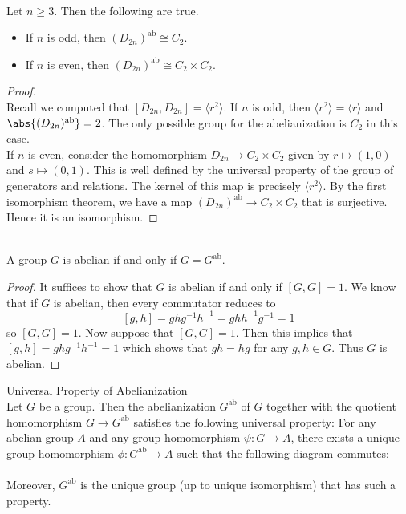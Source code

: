 \documentclass[a4paper]{article}
\begin{document}
\begin{eg}{}{}\\
Let $n\geq 3$. Then the following are true. 
\begin{itemize}
\item If $n$ is odd, then $(D_{2n})^\text{ab}\cong C_2$. 
\item If $n$ is even, then $(D_{2n})^\text{ab}\cong C_2\times C_2$. 
\end{itemize}
\begin{proof}\\
Recall we computed that $[D_{2n},D_{2n}]=\langle r^2\rangle$. If $n$ is odd, then $\langle r^2\rangle=\langle r\rangle$ and $\abs{(D_{2n})^\text{ab}}=2$. The only possible group for the abelianization is $C_2$ in this case. \\

If $n$ is even, consider the homomorphism $D_{2n}\to C_2\times C_2$ given by $r\mapsto(1,0)$ and $s\mapsto(0,1)$. This is well defined by the universal property of the group of generators and relations. The kernel of this map is precisely $\langle r^2\rangle$. By the first isomorphism theorem, we have a map $(D_{2n})^\text{ab}\to C_2\times C_2$ that is surjective. Hence it is an isomorphism. 
\end{proof}
\end{eg}

\begin{prp}{}{}\\
A group $G$ is abelian if and only if $G=G^\text{ab}$. 
\begin{proof}
It suffices to show that $G$ is abelian if and only if $[G,G]=1$. We know that if $G$ is abelian, then every commutator reduces to $$[g,h]=ghg^{-1}h^{-1}=ghh^{-1}g^{-1}=1$$ so $[G,G]=1$. Now suppose that $[G,G]=1$. Then this implies that $[g,h]=ghg^{-1}h^{-1}=1$ which shows that $gh=hg$ for any $g,h\in G$. Thus $G$ is abelian. 
\end{proof}
\end{prp}

\begin{prp}{Universal Property of Abelianization}{}\\
Let $G$ be a group. Then the abelianization $G^\text{ab}$ of $G$ together with the quotient homomorphism $G\to G^\text{ab}$ satisfies the following universal property: For any abelian group $A$ and any group homomorphism $\psi:G\to A$, there exists a unique group homomorphism $\phi:G^\text{ab}\to A$ such that the following diagram commutes: \\
 \\
Moreover, $G^\text{ab}$ is the unique group (up to unique isomorphism) that has such a property. 
\end{prp}
\end{document}
